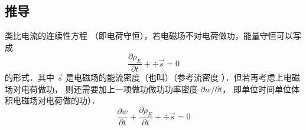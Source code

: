 \subsection{推导}
类比电流的连续性方程%
（即电荷守恒），若电磁场不对电荷做功，能量守恒可以写成
\begin{equation}
\frac{{\partial {\rho _E}}}{{\partial t}} + \div \vec s = 0
\end{equation} 
的形式．其中 $\vec s$ 是电磁场的能流密度（也叫）（参考流密度%
）．但若再考虑上电磁场对电荷做功， 则还需要加上一项做功做功功率密度 $\partial w/\partial t$， 即单位时间单位体积电磁场对电荷做的功）．
\begin{equation}\label{EBS_eq1}
\frac{{\partial w}}{{\partial t}} + \frac{{\partial {\rho _E}}}{{\partial t}} + \div \vec s = 0
\end{equation} 

